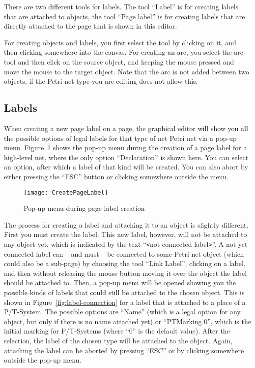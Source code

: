 There are two different tools for labels. The tool ``Label'' is for creating
labels that are attached to objects, the tool ``Page label'' is for creating
labels that are directly attached to the page that is shown in this editor.

For creating objects and labels, you first select the tool by clicking on
it, and then clicking somewhere into the canvas. For creating an arc, you
select the arc tool and then click on the source object, and keeping the
mouse pressed and move the mouse to the target object. Note that the arc is
not added between two objects, if the Petri net type you are editing
does not allow this.

\subsection{Labels} 
\label{subsec:labels}

When creating a new page label on a page, the graphical editor will show
you all the possible options of legal labels for that type of net Petri net
via a pop-up menu.
Figure~\ref{fig:pagelabel-creation} shows the pop-up menu during the
creation of a page label for a high-level net, where the only option
``Declaration'' is shown here. You can select an option, after which
a label of that kind will be created. You can also abort by either
pressing the ``ESC'' button or clicking somewhere outside the menu.

\begin{figure}[hbt!!]
  \centerline{\texttt{[image: CreatePageLabel]}}
  \caption{Pop-up menu during page label creation}
  \label{fig:pagelabel-creation}
\end{figure}

The process for creating a label and attaching it to an object is slightly
different. First you must create the label. This new label, however, will
not be attached to any object yet, which is indicated by the text
``\verb+<+not connected label\verb+>+''. A not yet connected label can -- and
must -- be connected to some Petri net object (which could also be a
sub-page) by choosing the tool ``Link Label'', clicking on a label, and then without releasing the
mouse button moving it over the object the label should be attached to.
Then, a pop-up menu will be opened showing you the possible kinds of labels
that could still be attached to the chosen object. This is shown in
Figure~\ref{fig:label-connection} for a label that is attached to a place
of a P/T-System.
The possible options are ``Name'' (which is a legal option for any object, but
only if there is no name attached yet) or ``PTMarking 0'', which is the initial marking
for P/T-Systems (where ``0'' is the default value). After the selection,
the label of the chosen type will be attached to the object.
Again, attaching the label can be aborted by pressing ``ESC'' or by
clicking somewhere outside the pop-up menu.

